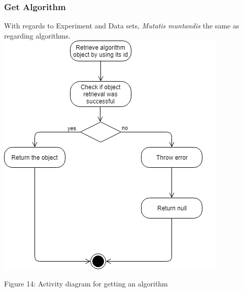     \subsubsection{Get Algorithm}
    \par With regards to Experiment and Data sets,
{ \textit{Mutatis muntandis} the same as regarding algorithms.} \newline \newline
    \includegraphics[width=\textwidth]{input_unit/images/get_algorithm_activity_diagram.png}
	\begin{center}
	    \small{Figure 14: Activity diagram for getting an algorithm }
    \end{center}
    
